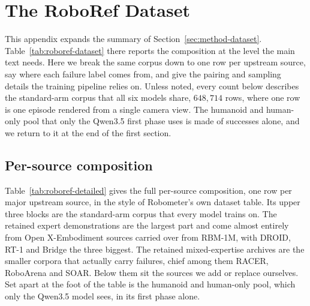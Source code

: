 \chapter{The RoboRef Dataset}
\label{apx:roboref-data}

This appendix expands the summary of Section~\ref{sec:method-dataset}. Table~\ref{tab:roboref-dataset} there reports the composition at the level the main text needs. Here we break the same corpus down to one row per upstream source, say where each failure label comes from, and give the pairing and sampling details the training pipeline relies on. Unless noted, every count below describes the standard-arm corpus that all six models share, $648{,}714$ rows, where one row is one episode rendered from a single camera view. The humanoid and human-only pool that only the Qwen3.5 first phase uses is made of successes alone, and we return to it at the end of the first section.

\section{Per-source composition}

Table~\ref{tab:roboref-detailed} gives the full per-source composition, one row per major upstream source, in the style of Robometer's own dataset table. Its upper three blocks are the standard-arm corpus that every model trains on. The retained expert demonstrations are the largest part and come almost entirely from Open X-Embodiment sources \citep{oneill_open_2024} carried over from RBM-1M, with DROID, RT-1 and Bridge the three biggest. The retained mixed-expertise archives are the smaller corpora that actually carry failures, chief among them RACER, RoboArena and SOAR. Below them sit the sources we add or replace ourselves. Set apart at the foot of the table is the humanoid and human-only pool, which only the Qwen3.5 model sees, in its first phase alone.

